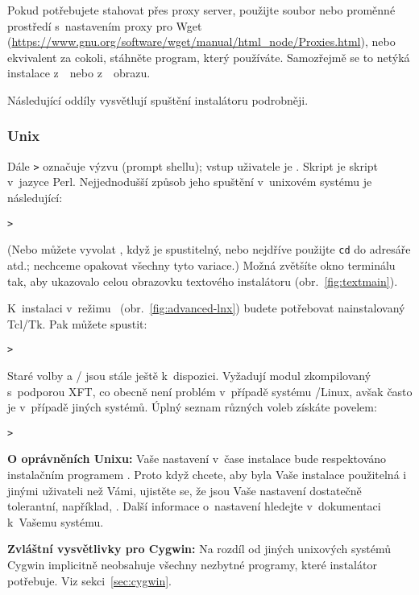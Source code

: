 \documentclass[\classoptions,slovak,english,czech]{\classname}
\begin{document}
Pokud potřebujete stahovat přes proxy server, použijte soubor  
nebo proměnné prostředí s~nastavením proxy pro Wget
(\url{https://www.gnu.org/software/wget/manual/html_node/Proxies.html}),
nebo ekvivalent za cokoli, stáhněte program, který používáte. Samozřejmě se to
netýká instalace z~\DVD\ nebo z~\ISO\ obrazu.

\noindent
Následující oddíly vysvětlují spuštění instalátoru podrobněji.

\subsubsection{Unix}

Dále \texttt{>} označuje výzvu (prompt shellu); vstup 
uživatele je .
Skript  je skript v~jazyce Perl. Nejjednodušší
způsob jeho spuštění v~unixovém systému je následující:
\begin{alltt}
> 
\end{alltt}
(Nebo můžete vyvolat , když je spustitelný, 
nebo nejdříve použijte \texttt{cd} do adresáře atd.; 
nechceme opakovat všechny tyto variace.)
Možná zvětšíte okno terminálu tak, aby ukazovalo celou 
obrazovku textového instalátoru (obr.~\ref{fig:textmain}).

K~instalaci v~režimu \GUI\ (obr.~\ref{fig:advanced-lnx}) 
budete potřebovat nainstalovaný Tcl/Tk.
Pak můžete spustit:
\begin{alltt}
> 
\end{alltt}

Staré volby  a / jsou stále 
ještě k~dispozici. Vyžadují modul  zkompilovaný 
s~podporou XFT, co obecně není problém v~případě systému  
\GNU/Linux, avšak často je v~případě jiných systémů. 
Úplný seznam různých voleb získáte povelem:
\begin{alltt}
> 
\end{alltt}

\textbf{O oprávněních Unixu:} Vaše nastavení  v~čase instalace 
bude respektováno instalačním programem \TL{}. Proto když chcete, aby byla Vaše 
instalace použitelná i jinými uživateli než Vámi, ujistěte se, že jsou Vaše
nastavení dostatečně tolerantní, například, . Další informace o~nastavení  hledejte v~dokumentaci k~Vašemu systému.

\textbf{Zvláštní vysvětlivky pro Cygwin:} Na rozdíl od jiných 
unixových systémů Cygwin implicitně
neobsahuje všechny nezbytné programy, které instalátor \TL{} potřebuje. 
Viz sekci~\ref{sec:cygwin}.
\end{document}
